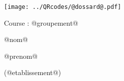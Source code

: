 \Huge

\begin{block} %



\vspace{0.5cm}


\begin{minipage}{0.48\linewidth}
\texttt{[image: ../QRcodes/@dossard@.pdf]}

\vspace{0.5cm}

	Course : @groupement@
\end{minipage}
\begin{minipage}{0.5\linewidth}
{}\hfill {}
{}\hfill {}

\bigskip

\begin{center}
@nom@

@prenom@

(@etablissement@)
\end{center}
\end{minipage}


\end{block}

\vfill